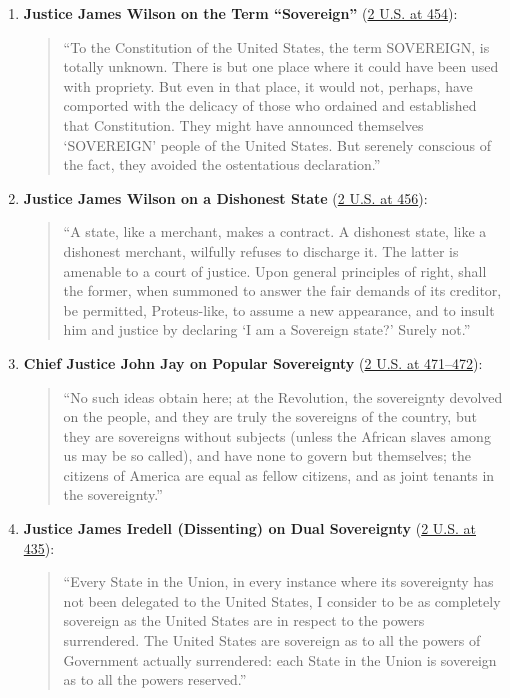 \documentclass[12pt]{article}
\begin{document}
\begin{enumerate}
  \item \textbf{Justice James Wilson on the Term ``Sovereign''} (\href{https://supreme.justia.com/cases/federal/us/2/419/}{2 U.S. at 454}):
  \begin{quote}
    ``To the Constitution of the United States, the term SOVEREIGN, is totally unknown. There is but one place where it could have been used with propriety. But even in that place, it would not, perhaps, have comported with the delicacy of those who ordained and established that Constitution. They might have announced themselves `SOVEREIGN' people of the United States. But serenely conscious of the fact, they avoided the ostentatious declaration.''
  \end{quote}

  \item \textbf{Justice James Wilson on a Dishonest State} (\href{https://supreme.justia.com/cases/federal/us/2/419/}{2 U.S. at 456}):
  \begin{quote}
    ``A state, like a merchant, makes a contract. A dishonest state, like a dishonest merchant, wilfully refuses to discharge it. The latter is amenable to a court of justice. Upon general principles of right, shall the former, when summoned to answer the fair demands of its creditor, be permitted, Proteus-like, to assume a new appearance, and to insult him and justice by declaring `I am a Sovereign state?' Surely not.''
  \end{quote}

  \item \textbf{Chief Justice John Jay on Popular Sovereignty} (\href{https://supreme.justia.com/cases/federal/us/2/419/}{2 U.S. at 471--472}):
  \begin{quote}
    ``No such ideas obtain here; at the Revolution, the sovereignty devolved on the people, and they are truly the sovereigns of the country, but they are sovereigns without subjects (unless the African slaves among us may be so called), and have none to govern but themselves; the citizens of America are equal as fellow citizens, and as joint tenants in the sovereignty.''
  \end{quote}

  \item \textbf{Justice James Iredell (Dissenting) on Dual Sovereignty} (\href{https://supreme.justia.com/cases/federal/us/2/419/}{2 U.S. at 435}):
  \begin{quote}
    ``Every State in the Union, in every instance where its sovereignty has not been delegated to the United States, I consider to be as completely sovereign as the United States are in respect to the powers surrendered. The United States are sovereign as to all the powers of Government actually surrendered: each State in the Union is sovereign as to all the powers reserved.''
  \end{quote}
\end{enumerate}
\end{document}
